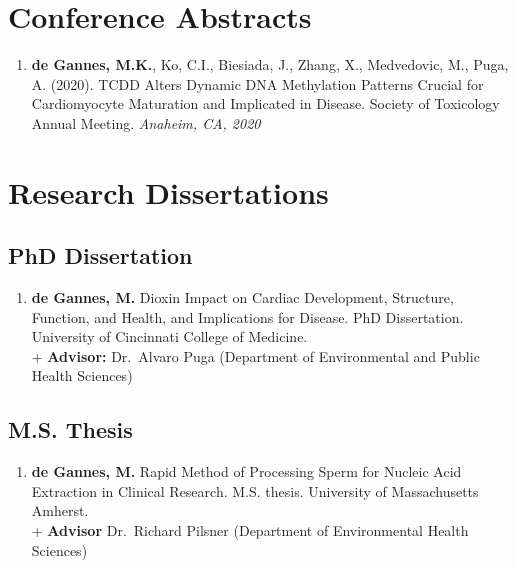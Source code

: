 \documentclass[10pt,a4paper,]{article}
\providecommand{\tightlist}{%
  \setlength{\itemsep}{0pt}\setlength{\parskip}{0pt}}
\begin{document}
\section{Conference Abstracts}\label{conference-abstracts}

\begin{enumerate}
\def\labelenumi{\arabic{enumi}.}
\tightlist
\item
  \textbf{de Gannes, M.K.}, Ko, C.I., Biesiada, J., Zhang, X.,
  Medvedovic, M., Puga, A. (2020). TCDD Alters Dynamic DNA Methylation
  Patterns Crucial for Cardiomyocyte Maturation and Implicated in
  Disease. Society of Toxicology Annual Meeting. \emph{Anaheim, CA,
  2020}
\end{enumerate}

\section{Research Dissertations}\label{research-dissertations}

\subsection{PhD Dissertation}\label{phd-dissertation}

\begin{enumerate}
\def\labelenumi{\arabic{enumi}.}
\tightlist
\item
  \textbf{de Gannes, M.} Dioxin Impact on Cardiac Development,
  Structure, Function, and Health, and Implications for Disease. PhD
  Dissertation. University of Cincinnati College of Medicine.\\
  + \textbf{Advisor:} Dr.~Alvaro Puga (Department of Environmental and
  Public Health Sciences)
\end{enumerate}

\subsection{M.S. Thesis}\label{m.s.-thesis}

\begin{enumerate}
\def\labelenumi{\arabic{enumi}.}
\tightlist
\item
  \textbf{de Gannes, M.} Rapid Method of Processing Sperm for Nucleic
  Acid Extraction in Clinical Research. M.S. thesis. University of
  Massachusetts Amherst.\\
  + \textbf{Advisor} Dr.~Richard Pilsner (Department of Environmental
  Health Sciences)
\end{enumerate}
\end{document}
